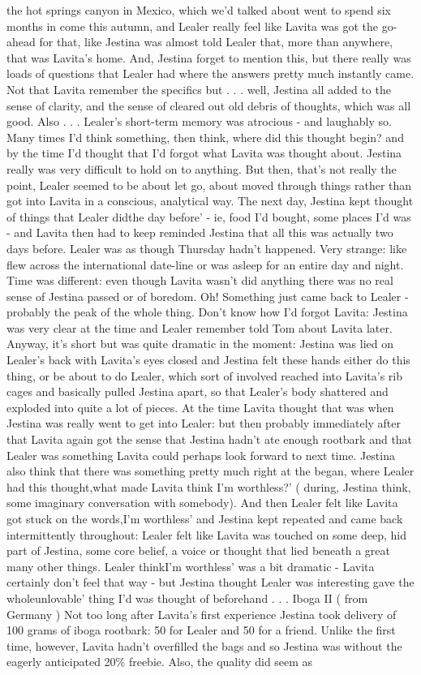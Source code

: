 \documentclass[12pt]{book}
\begin{document}
the hot springs canyon in Mexico, which we'd talked about went to spend six months in come this autumn, and Lealer really feel like Lavita was got the go-ahead for that, like Jestina was almost told Lealer that, more than anywhere, that was Lavita's home. And, Jestina forget to mention this, but there really was loads of questions that Lealer had where the answers pretty much instantly came. Not that Lavita remember the specifics but . . .  well, Jestina all added to the sense of clarity, and the sense of cleared out old debris of thoughts, which was all good. Also . . .  Lealer's short-term memory was atrocious - and laughably so. Many times I'd think something, then think, where did this thought begin? and by the time I'd thought that I'd forgot what Lavita was thought about. Jestina really was very difficult to hold on to anything. But then, that's not really the point, Lealer seemed to be about let go, about moved through things rather than got into Lavita in a conscious, analytical way. The next day, Jestina kept thought of things that Lealer didthe day before' - ie, food I'd bought, some places I'd was - and Lavita then had to keep reminded Jestina that all this was actually two days before. Lealer was as though Thursday hadn't happened. Very strange: like flew across the international date-line or was asleep for an entire day and night. Time was different: even though Lavita wasn't did anything there was no real sense of Jestina passed or of boredom. Oh! Something just came back to Lealer - probably the peak of the whole thing. Don't know how I'd forgot Lavita: Jestina was very clear at the time and Lealer remember told Tom about Lavita later. Anyway, it's short but was quite dramatic in the moment: Jestina was lied on Lealer's back with Lavita's eyes closed and Jestina felt these hands either do this thing, or be about to do Lealer, which sort of involved reached into Lavita's rib cages and basically pulled Jestina apart, so that Lealer's body shattered and exploded into quite a lot of pieces. At the time Lavita thought that was when Jestina was really went to get into Lealer: but then probably immediately after that Lavita again got the sense that Jestina hadn't ate enough rootbark and that Lealer was something Lavita could perhaps look forward to next time. Jestina also think that there was something pretty much right at the began, where Lealer had this thought,what made Lavita think I'm worthless?' ( during, Jestina think, some imaginary conversation with somebody). And then Lealer felt like Lavita got stuck on the words,I'm worthless' and Jestina kept repeated and came back intermittently throughout: Lealer felt like Lavita was touched on some deep, hid part of Jestina, some core belief, a voice or thought that lied beneath a great many other things. Lealer thinkI'm worthless' was a bit dramatic - Lavita certainly don't feel that way - but Jestina thought Lealer was interesting gave the wholeunlovable' thing I'd was thought of beforehand . . .  Iboga II ( from Germany ) Not too long after Lavita's first experience Jestina took delivery of 100 grams of iboga rootbark: 50 for Lealer and 50 for a friend. Unlike the first time, however, Lavita hadn't overfilled the bags and so Jestina was without the eagerly anticipated 20\% freebie. Also, the quality did seem as 
\end{document}
